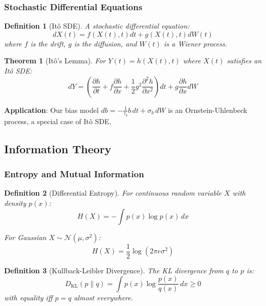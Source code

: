 \documentclass[11pt]{article}
\newtheorem{theorem}{Theorem}[section]
\newtheorem{definition}{Definition}[section]
\begin{document}
\subsubsection{Stochastic Differential Equations}

\begin{definition}[Itô SDE]
A stochastic differential equation:
\begin{equation}
dX(t) = f(X(t), t)dt + g(X(t), t)dW(t)
\end{equation}
where $f$ is the drift, $g$ is the diffusion, and $W(t)$ is a Wiener process.
\end{definition}

\begin{theorem}[Itô's Lemma]
For $Y(t) = h(X(t), t)$ where $X(t)$ satisfies an Itô SDE:
\begin{equation}
dY = \left(\frac{\partial h}{\partial t} + f\frac{\partial h}{\partial x} + \frac{1}{2}g^2\frac{\partial^2 h}{\partial x^2}\right)dt + g\frac{\partial h}{\partial x}dW
\end{equation}
\end{theorem}

\textbf{Application}: Our bias model $db = -\frac{1}{\tau_b}b\,dt + \sigma_b\,dW$ is an Ornstein-Uhlenbeck process, a special case of Itô SDE.

\subsection{Information Theory}

\subsubsection{Entropy and Mutual Information}

\begin{definition}[Differential Entropy]
For continuous random variable $X$ with density $p(x)$:
\begin{equation}
H(X) = -\int p(x)\log p(x)\,dx
\end{equation}

For Gaussian $X \sim \mathcal{N}(\mu, \sigma^2)$:
\begin{equation}
H(X) = \frac{1}{2}\log(2\pi e \sigma^2)
\end{equation}
\end{definition}

\begin{definition}[Kullback-Leibler Divergence]
The KL divergence from $q$ to $p$ is:
\begin{equation}
D_{\text{KL}}(p \| q) = \int p(x)\log\frac{p(x)}{q(x)}\,dx \geq 0
\end{equation}
with equality iff $p = q$ almost everywhere.
\end{definition}
\end{document}
